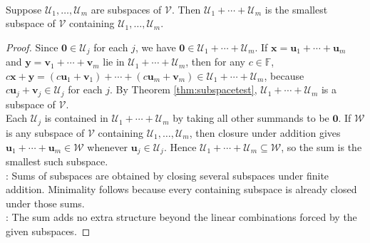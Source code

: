 \begin{proposition} \label{prop:sum-subspaces-smallest-containing-subspace} \\
Suppose $\mathcal{U}_1,\ldots,\mathcal{U}_m$ are subspaces of $\mathcal{V}$. Then $\mathcal{U}_1+\cdots+\mathcal{U}_m$ is the smallest subspace of $\mathcal{V}$ containing $\mathcal{U}_1,\ldots,\mathcal{U}_m$.
\begin{proof}
Since $\mathbf{0}\in\mathcal{U}_j$ for each $j$, we have $\mathbf{0}\in\mathcal{U}_1+\cdots+\mathcal{U}_m$. If $\mathbf{x}=\mathbf{u}_1+\cdots+\mathbf{u}_m$ and $\mathbf{y}=\mathbf{v}_1+\cdots+\mathbf{v}_m$ lie in $\mathcal{U}_1+\cdots+\mathcal{U}_m$, then for any $c \in \mathbb{F}$, $c\mathbf{x}+\mathbf{y} = (c\mathbf{u}_1+\mathbf{v}_1)+\cdots+(c\mathbf{u}_m+\mathbf{v}_m) \in \mathcal{U}_1+\cdots+\mathcal{U}_m$, because $c\mathbf{u}_j+\mathbf{v}_j\in\mathcal{U}_j$ for each $j$. By Theorem \ref{thm:subspacetest}, $\mathcal{U}_1+\cdots+\mathcal{U}_m$ is a subspace of $\mathcal{V}$.\\
Each $\mathcal{U}_j$ is contained in $\mathcal{U}_1+\cdots+\mathcal{U}_m$ by taking all other summands to be $\mathbf{0}$. If $\mathcal{W}$ is any subspace of $\mathcal{V}$ containing $\mathcal{U}_1,\ldots,\mathcal{U}_m$, then closure under addition gives $\mathbf{u}_1+\cdots+\mathbf{u}_m\in\mathcal{W}$ whenever $\mathbf{u}_j\in\mathcal{U}_j$. Hence $\mathcal{U}_1+\cdots+\mathcal{U}_m\subseteq\mathcal{W}$, so the sum is the smallest such subspace.\\
: Sums of subspaces are obtained by closing several subspaces under finite addition. Minimality follows because every containing subspace is already closed under those sums.\\
: The sum adds no extra structure beyond the linear combinations forced by the given subspaces.
\end{proof}
\end{proposition}

